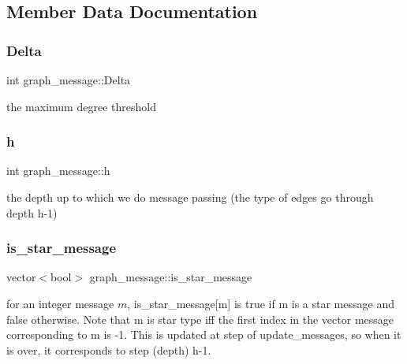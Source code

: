 \subsection{Member Data Documentation}
\mbox{\label{classgraph__message_a45dfd061b7bc73572e5132fbf66efd55}} 
\subsubsection{\texorpdfstring{Delta}{Delta}}
{\footnotesize\ttfamily int graph\+\_\+message\+::\+Delta\hspace{0.3cm}{\ttfamily [private]}}



the maximum degree threshold 

\mbox{\label{classgraph__message_a934d63ed7275c211e13c6fb68824ed46}} 
\subsubsection{\texorpdfstring{h}{h}}
{\footnotesize\ttfamily int graph\+\_\+message\+::h\hspace{0.3cm}{\ttfamily [private]}}



the depth up to which we do message passing (the type of edges go through depth h-\/1) 

\mbox{\label{classgraph__message_a55ff5531a0043106369e84a7bc45e22d}} 
\subsubsection{\texorpdfstring{is\+\_\+star\+\_\+message}{is\_star\_message}}
{\footnotesize\ttfamily vector$<$bool$>$ graph\+\_\+message\+::is\+\_\+star\+\_\+message}



for an integer message $m$, is\+\_\+star\+\_\+message\mbox{[}m\mbox{]} is true if m is a star message and false otherwise. Note that m is star type iff the first index in the vector message corresponding to m is -\/1. This is updated at step of update\+\_\+messages, so when it is over, it corresponds to step (depth) h-\/1. 

